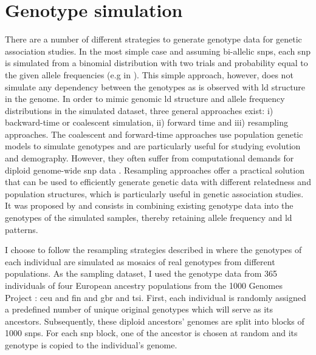 \section{Genotype simulation}
\label{section:genotype-simulation}
There are a number of different strategies to generate genotype data for genetic association studies. In the most simple case and assuming bi-allelic \glspl{snp}, each \gls{snp} is simulated from a binomial distribution with two trials and probability equal to the given allele frequencies  (e.g in \citep{Lippert2013}). This simple approach, however, does not simulate any dependency between the genotypes as is observed with \gls{ld} structure in the genome. In order to mimic genomic \gls{ld} structure and allele frequency distributions in the simulated dataset, three general approaches exist: i) backward-time or coalescent simulation, ii) forward time and iii) resampling approaches. The coalescent \citep{Hudson2002,Ewing2010,Kelleher2016} and forward-time approaches \citep{Peng2007,Hoggart2007,Carvajal-Rodriguez2008} use population genetic models to simulate genotypes and are particularly useful for studying evolution and demography. However, they often suffer from computational demands for diploid genome-wide \gls{snp} data \citep{Liu2008,Yuan2012}. Resampling approaches offer a practical solution that can be used to efficiently generate genetic data with different relatedness and population structures, which is particularly useful in genetic association studies. It was proposed by \citet{Wright2007} and consists in combining existing genotype data into the genotypes of the simulated samples, thereby retaining allele frequency and \gls{ld} patterns. 

I choose to follow the resampling strategies described in \citep{Loh2014,Casale2015} where the genotypes of each individual are simulated as mosaics of real genotypes from different populations. As the sampling dataset, I used the genotype data from \num{365} individuals of four European ancestry populations from the 1000 Genomes Project \citep{1000Genomes2015}:  \gls{ceu} and \gls{fin} and  \gls{gbr} and \gls{tsi}.  First, each individual is randomly assigned a predefined number of unique original genotypes which will serve as its ancestors. Subsequently, these diploid ancestors' genomes are split into blocks of \num{1000} \glspl{snp}. For each \gls{snp} block, one of the ancestor is chosen at random and its genotype is copied to the individual's genome. 


